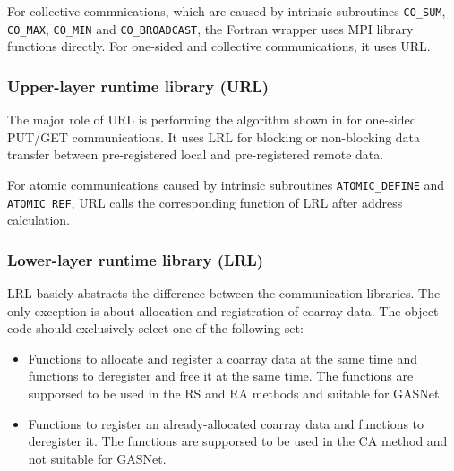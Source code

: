 For collective commnications, which are caused by intrinsic subroutines 
{\tt CO\_SUM}, {\tt CO\_MAX}, {\tt CO\_MIN} and {\tt CO\_BROADCAST}, 
the Fortran wrapper uses MPI library functions directly.
%
For one-sided and collective communications, it uses URL.




\subsubsection{Upper-layer runtime library (URL)}

The major role of URL is performing the algorithm shown in 
for one-sided PUT/GET communications.
It uses LRL for blocking or non-blocking data transfer 
between pre-registered local and pre-registered remote data.

For atomic communications caused by intrinsic subroutines
{\tt ATOMIC\_DEFINE} and {\tt ATOMIC\_REF}, 
URL calls the corresponding function of LRL after address calculation.


\subsubsection{Lower-layer runtime library (LRL)}

LRL basicly abstracts the difference between the communication libraries.
The only exception is about allocation and registration of coarray data.
The object code should exclusively select one of the following set:

\begin{itemize}
\item
Functions to allocate and register a coarray data at the same time
and functions to deregister and free it at the same time.
The functions are supporsed to be used in the RS and RA methods and
suitable for GASNet.

\item
Functions to register an already-allocated coarray data 
and functions to deregister it.
The functions are supporsed to be used in the CA method and
not suitable for GASNet.
\end{itemize}

